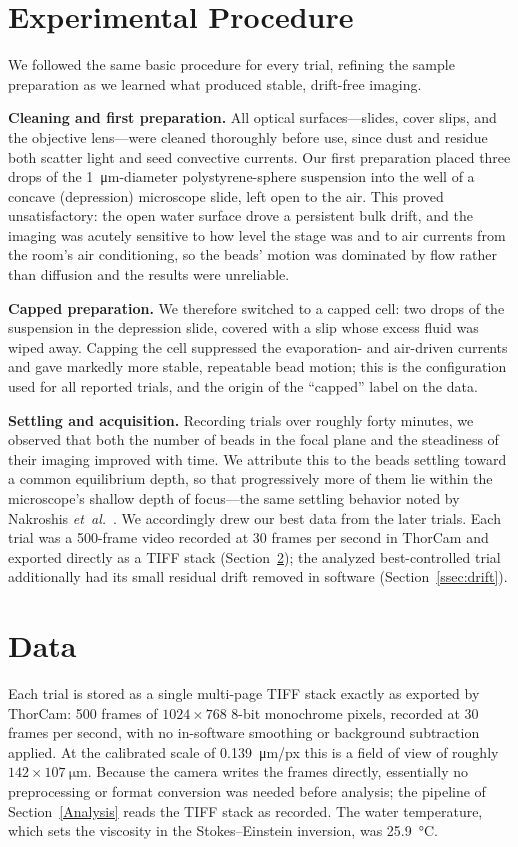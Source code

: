 \documentclass[11pt]{article}
\begin{document}
\FloatBarrier
\section{Experimental Procedure}
\label{Experimental Procedure}
We followed the same basic procedure for every trial, refining the sample
preparation as we learned what produced stable, drift-free imaging.

\textbf{Cleaning and first preparation.} All optical surfaces---slides, cover slips,
and the objective lens---were cleaned thoroughly before use, since dust and residue
both scatter light and seed convective currents. Our first preparation placed three
drops of the \SI{1}{\micro\meter}-diameter polystyrene-sphere suspension into the
well of a concave (depression) microscope slide, left open to the air. This proved
unsatisfactory: the open water surface drove a persistent bulk drift, and the imaging
was acutely sensitive to how level the stage was and to air currents from the room's
air conditioning, so the beads' motion was dominated by flow rather than diffusion
and the results were unreliable.

\textbf{Capped preparation.} We therefore switched to a capped cell: two drops of the
suspension in the depression slide, covered with a slip whose excess fluid was wiped
away. Capping the cell suppressed the evaporation- and air-driven currents and gave
markedly more stable, repeatable bead motion; this is the configuration used for all
reported trials, and the origin of the ``capped'' label on the data.

\textbf{Settling and acquisition.} Recording trials over roughly forty minutes, we
observed that both the number of beads in the focal plane and the steadiness of their
imaging improved with time. We attribute this to the beads settling toward a common
equilibrium depth, so that progressively more of them lie within the microscope's
shallow depth of focus---the same settling behavior noted by Nakroshis
\textit{et~al.}~\cite{nakroshis}. We accordingly drew our best data from the later
trials. Each trial was a 500-frame video recorded at 30 frames per second in ThorCam
and exported directly as a TIFF stack (Section~\ref{Data}); the analyzed
best-controlled trial additionally had its small residual drift removed in software
(Section~\ref{ssec:drift}).

\FloatBarrier
\section{Data}
\label{Data}
Each trial is stored as a single multi-page TIFF stack exactly as exported by
ThorCam: 500 frames of $1024\times768$ 8-bit monochrome pixels, recorded at 30 frames
per second, with no in-software smoothing or background subtraction applied. At the
calibrated scale of \SI{0.139}{\micro\meter}/px this is a field of view of roughly
$142\times107~\si{\micro\meter}$. Because the camera writes the frames directly,
essentially no preprocessing or format conversion was needed before analysis; the
pipeline of Section~\ref{Analysis} reads the TIFF stack as recorded. The water
temperature, which sets the viscosity in the Stokes--Einstein inversion, was
\SI{25.9}{\celsius}.
\end{document}
